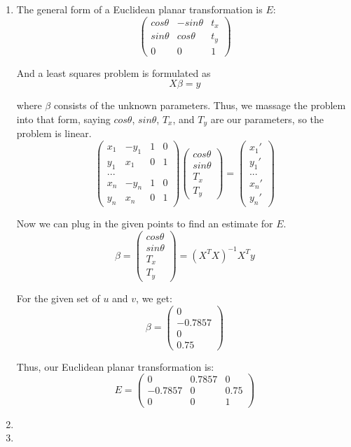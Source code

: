 \documentclass[11pt]{article}
\begin{document}
\begin{enumerate}
\item
    The general form of a Euclidean planar transformation is $E$:
    $$\begin{pmatrix}cos\theta&-sin\theta&t_x\\sin\theta&cos\theta&t_y\\
    0&0&1\end{pmatrix}$$

    And a least squares problem is formulated as
    $$X\beta = y$$

    where $\beta$ consists of the unknown parameters.  Thus, we massage the
    problem into that form, saying $cos\theta$, $sin\theta$, $T_x$, and $T_y$
    are our parameters, so the problem is linear.
    $$\begin{pmatrix}x_1&-y_1&1&0\\y_1&x_1&0&1\\...\\x_n&-y_n&1&0\\y_n&x_n&0&1\end{pmatrix}
    \begin{pmatrix}cos\theta\\sin\theta\\T_x\\T_y\end{pmatrix} =
    \begin{pmatrix}x_1'\\y_1'\\...\\x_n'\\y_n'\end{pmatrix}$$

    Now we can plug in the given points to find an estimate for $E$.
    $$\beta = \begin{pmatrix}cos\theta\\sin\theta\\T_x\\T_y\end{pmatrix} = 
        (X^TX)^{-1}X^Ty$$

    For the given set of $u$ and $v$, we get:
    $$\beta = \begin{pmatrix}0\\-0.7857\\0\\0.75\end{pmatrix}$$

    Thus, our Euclidean planar transformation is:
    $$E = \begin{pmatrix}0&0.7857&0\\-0.7857&0&0.75\\0&0&1\end{pmatrix}$$

\item
\item
\end{enumerate}
\end{document}

